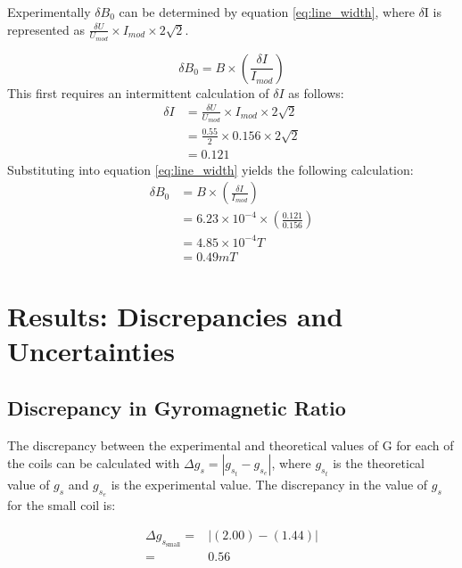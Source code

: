 \documentclass[a4paper]{article}
\begin{document}
\newpage

Experimentally $\delta B_0$ can be determined by equation \ref{eq:line_width}, where $\delta$I is represented as $\frac{\delta U}{U_{mod}} \times  I_{mod} \times 2\sqrt{2}$.

\begin{equation}
\label{eq:line_width}
\delta B_0 = B \times \left( \frac{\delta I}{I_{mod}} \right)
\end{equation}
%
This first requires an intermittent calculation of $\delta I$ as follows:
%
\begin{align*}
\delta I &= \frac{\delta U}{U_{mod}} \times  I_{mod} \times 2\sqrt{2} \\
         &= \frac{0.55}{2} \times 0.156 \times 2\sqrt{2} \\
         &= 0.121
\end{align*}
%
Substituting into equation \ref{eq:line_width} yields the following calculation:
%
\begin{align*}
\delta B_0 &= B \times \left( \frac {\delta I} {I_{mod}} \right) \\
           &= 6.23 \times 10^{-4} \times \left( \frac {0.121} {0.156} \right) \\
           &= 4.85 \times 10^{-4} T \\
           &= 0.49 mT
\end{align*}


\section{Results: Discrepancies and Uncertainties}

\subsection{Discrepancy in Gyromagnetic Ratio}
\qq The discrepancy between the experimental and theoretical values of G for
each of the coils can be calculated with \( \Delta g_s = | g_{s_t} - g_{s_e} |
\), where \( g_{s_t} \) is the theoretical value of \( g_s \) and \( g_{s_e} \)
is the experimental value. The discrepancy in the value of \( g_s \) for the
small coil is:

\begin{align*}
  \Delta g_{s_{\text{small}}} =& \left| (2.00) - (1.44) \right| \\
   =& 0.56 \\
\end{align*}
\end{document}
